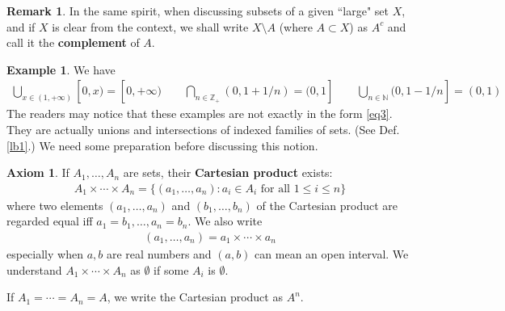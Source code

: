 \documentclass[12pt,b5paper,notitlepage]{article}
\theoremstyle{definition}
\newtheorem{eg}[df]{Example}
\newtheorem{rem}[df]{Remark}
\newtheorem*{axiom}{Axiom}
\theoremstyle{plain}
\newcommand{\Nbb}{\mathbb N}
\newcommand{\Zbb}{\mathbb Z}
\numberwithin{equation}{section}
\begin{document}
\begin{rem}
In the same spirit, when discussing subsets of a given ``large" set $X$, and if $X$ is clear from the context, we shall write $X\setminus A$ (where $A\subset X$) as $A^c$  and call it the \textbf{complement} of $A$.
\end{rem}


\begin{eg}
We have
\begin{gather*}
\bigcup_{x\in(1,+\infty)}[0,x)=[0,+\infty)\qquad\bigcap_{n\in\Zbb_+}(0,1+1/n)=(0,1]\qquad \bigcup_{n\in\Nbb}(0,1-1/n]=(0,1)
\end{gather*}
The readers may notice that these examples are not exactly in the form \eqref{eq3}. They are actually unions and intersections of indexed families of sets. (See Def. \ref{lb1}.) We need some preparation before discussing this notion.
\end{eg}




\begin{axiom}
If $A_1,\dots,A_n$ are sets, their \textbf{Cartesian product} exists:
\begin{align*}
A_1\times\cdots\times A_n=\{(a_1,\dots,a_n): a_i\in A_i\text{ for all }1\leq i\leq n\}
\end{align*}
where two elements $(a_1,\dots,a_n)$ and $(b_1,\dots,b_n)$ of the Cartesian product are regarded equal iff $a_1=b_1,\dots,a_n=b_n$. We also write
\begin{align*}
(a_1,\dots,a_n)=a_1\times\cdots\times a_n
\end{align*}
especially when $a,b$ are real numbers and $(a,b)$ can mean an open interval. We understand $A_1\times\cdots\times A_n$ as $\emptyset$ if some $A_i$ is $\emptyset$.

If $A_1=\cdots=A_n=A$, we write the Cartesian product as $A^n$. \hfill\qedsymbol
\end{axiom}
\end{document}
